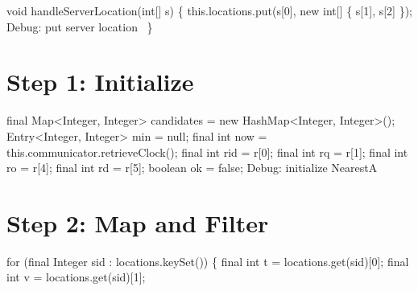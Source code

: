 \nwenddocs{}\endmoddef\nwstartdeflinemarkup{}\nwenddeflinemarkup
void handleServerLocation(int[] s) \{
  this.locations.put(s[0], new int[] \{ s[1], s[2] \});
  \LA{}Debug: put server location~{\nwtagstyle{}}\RA{}
\}
\nwendcode{}\nwdocspar

\section{Step 1: Initialize}

\nwenddocs{}\endmoddef\nwstartdeflinemarkup{}\nwenddeflinemarkup
final Map<Integer, Integer> candidates = new HashMap<Integer, Integer>();
Entry<Integer, Integer> min = null;
final int now = this.communicator.retrieveClock();
final int rid = r[0];
final int rq  = r[1];
final int ro  = r[4];
final int rd  = r[5];
boolean ok = false;
\LA{}Debug: initialize NearestA~{\nwtagstyle{}}\RA{}
\nwendcode{}\nwdocspar

\section{Step 2: Map and Filter}

\nwenddocs{}\endmoddef\nwstartdeflinemarkup{}\nwenddeflinemarkup
for (final Integer sid : locations.keySet()) \{
  final int t = locations.get(sid)[0];
  final int v = locations.get(sid)[1];

